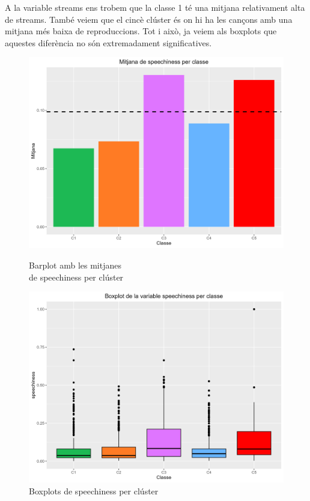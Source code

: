 \documentclass{article}
\begin{document}
A la variable streams ens trobem que la classe 1 té una mitjana relativament alta de streams. També veiem que el cincè clúster és on hi ha les cançons amb una mitjana més baixa de reproduccions. Tot i això, ja veiem als boxplots que aquestes diferència no són extremadament significatives. 

\begin{figure}[H]
\centering
    \begin{minipage}{.49\textwidth}
        \centering
        \includegraphics[width=0.95\linewidth]{Images/5_Profiling/numeriques/Num_BarPlot_speechiness.png}
        \caption{Barplot amb les mitjanes \\ de speechiness per clúster}
        \label{fig:Num_BarPlot_speechiness}
    \end{minipage}%
    \begin{minipage}{.49\textwidth}
        \centering
        \includegraphics[width=0.95\linewidth]{Images/5_Profiling/numeriques/Num_BoxPlot_speechiness.png}
        \caption{Boxplots de speechiness per clúster}
        \label{fig:Num_BoxPlot_speechiness}
    \end{minipage}%
\end{figure}
\end{document}
